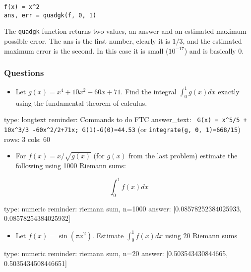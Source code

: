 \documentclass[12pt]{article}
\begin{document}
\begin{verbatim}
f(x) = x^2
ans, err = quadgk(f, 0, 1)
\end{verbatim}
The \texttt{quadgk} function returns two values, an answer and an
estimated maximum possible error. The ans is the first number, clearly
it is $1/3$, and the estimated maximum error is the second. In this case
it is small ($10^{-17}$) and is basically 0.

\subsubsection{Questions}

\begin{itemize}
\itemsep1pt\parskip0pt
\item
  Let $g(x) = x^4 + 10x^2 - 60x + 71$. Find the integral
  $\int_0^1   g(x) dx$ exactly using the fundamental theorem of
  calculus.
\end{itemize}

\begin{answer}
type: longtext
reminder: Commands to do FTC
answer_text: \verb# G(x) = x^5/5 + 10x^3/3 -60x^2/2+71x; G(1)-G(0)=44.53# (or \verb#integrate(g, 0, 1)=668/15#) 
rows: 3
cols: 60
\end{answer}

\begin{itemize}
\itemsep1pt\parskip0pt
\item
  For $f(x) = x/\sqrt{g(x)}$ (for $g(x)$ from the last problem) estimate
  the following using 1000 Riemann sums:
\end{itemize}

\[
\int_0^1 f(x) dx
\]

\begin{answer}
    type: numeric
    reminder: riemann sum, n=1000
    answer: [0.08578252384025933, 0.08578254384025932]

\end{answer}

\begin{itemize}
\itemsep1pt\parskip0pt
\item
  Let $f(x) = \sin(\pi x^2)$. Estimate $\int_0^1 f(x) dx$ using 20
  Riemann sums
\end{itemize}

\begin{answer}
    type: numeric
    reminder: riemann sum, n=20
    answer: [0.503543430844665, 0.5035434508446651]

\end{answer}
\end{document}
